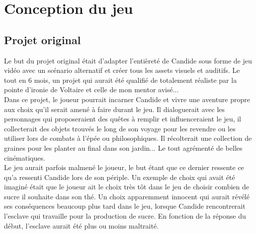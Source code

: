 \documentclass[11pt]{article}
\begin{document}
\section{Conception du jeu}

\subsection{Projet original}
Le but du projet original était d'adapter l'entièreté de Candide sous forme de jeu vidéo avec un scénario alternatif et créer tous les assets visuels et auditifs. Le tout en 6 mois, un projet qui aurait été qualifié de totalement réaliste par la pointe d'ironie de Voltaire et celle de mon mentor avisé...\\

Dans ce projet, le joueur pourrait incarner Candide et vivre une aventure propre aux choix qu'il serait amené à faire durant le jeu. Il dialoguerait avec les personnages qui proposeraient des quêtes à remplir et influenceraient le jeu, il collecterait des objets trouvés le long de son voyage pour les revendre ou les utiliser lors de combats à l'épée ou philosophiques. Il récolterait une collection de graines pour les planter au final dans son jardin... Le tout agrémenté de belles cinématiques.\\ Le jeu aurait parfois malmené le joueur, le but étant que ce dernier ressente ce qu'a ressenti Candide lors de son périple. Un exemple de choix qui avait été imaginé était  que le joueur ait le choix très tôt dans le jeu de choisir combien de sucre il souhaite dans son thé. Un choix apparemment innocent qui aurait révélé ses conséquences beaucoup plus tard dans le jeu, lorsque Candide rencontrerait l'esclave qui travaille pour la production de sucre. En fonction de la réponse du début, l'esclave aurait été plus ou moins maltraité. 
\end{document}
